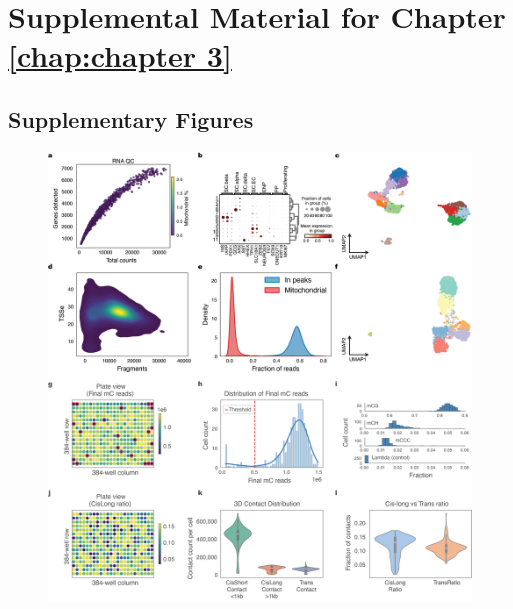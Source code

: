 \appendix{}

\chapter{Supplemental Material for Chapter \ref{chap:chapter 3}}

\section{Supplementary Figures}

\begin{figure}[p]
    \centering
    \includegraphics[width=\textwidth]{3_figures-and-files/ExtendedFig1.png}

\end{figure}
